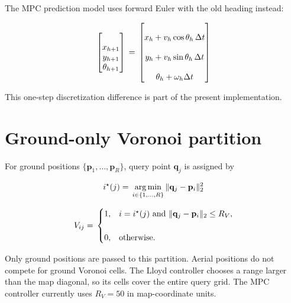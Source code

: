 \documentclass[11pt]{article}
\begin{document}
The MPC prediction model uses forward Euler with the old heading instead:


\begin{equation}
\begin{bmatrix} \\
x_{h+1}\\y_{h+1}\\\theta_{h+1} \\
\end{bmatrix} \\
= \\
\begin{bmatrix} \\
x_h+v_h\cos\theta_h\,\Delta t\\ \\
y_h+v_h\sin\theta_h\,\Delta t\\ \\
\theta_h+\omega_h\Delta t \\
\end{bmatrix}
\end{equation}


This one-step discretization difference is part of the present implementation.


\section{Ground-only Voronoi partition}


For ground positions $\{\mathbf p_1,\ldots,\mathbf p_R\}$, query point $\mathbf q_j$ is assigned by


\begin{equation}
i^\star(j) \\
= \\
\operatorname*{arg\,min}_{i\in\{1,\ldots,R\}} \\
\lVert\mathbf q_j-\mathbf p_i\rVert_2^2
\end{equation}


\begin{equation}
V_{ij} \\
= \\
\begin{cases}
1, & i=i^\star(j)
\text{ and }
\lVert\mathbf q_j-\mathbf p_i\rVert_2\le R_V,\\ \\
0, & \text{otherwise}. \\
\end{cases}
\end{equation}


Only ground positions are passed to this partition. Aerial positions do not compete for ground Voronoi cells. The Lloyd controller chooses a range larger than the map diagonal, so its cells cover the entire query grid. The MPC controller currently uses $R_V=50$ in map-coordinate units.
\end{document}
